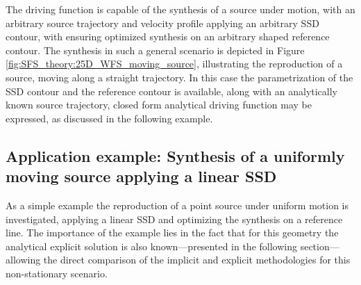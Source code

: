 The driving function is capable of the synthesis of a source under motion, with an arbitrary source trajectory and velocity profile applying an arbitrary SSD contour, with ensuring optimized synthesis on an arbitrary shaped reference contour.
The synthesis in such a general scenario is depicted in Figure \ref{fig:SFS_theory:25D_WFS_moving_source}, illustrating the reproduction of a source, moving along a straight trajectory.
In this case the parametrization of the SSD contour and the reference contour is available, along with an analytically known source trajectory, closed form analytical driving function may be expressed, as discussed in the following example.

\subsection*{Application example: Synthesis of a uniformly moving source applying a linear SSD}

As a simple example the reproduction of a point source under uniform motion is investigated, applying a linear SSD and optimizing the synthesis on a reference line.
The importance of the example lies in the fact that for this geometry the analytical explicit solution is also known---presented in the following section---allowing the direct comparison of the implicit and explicit methodologies for this non-stationary scenario.

